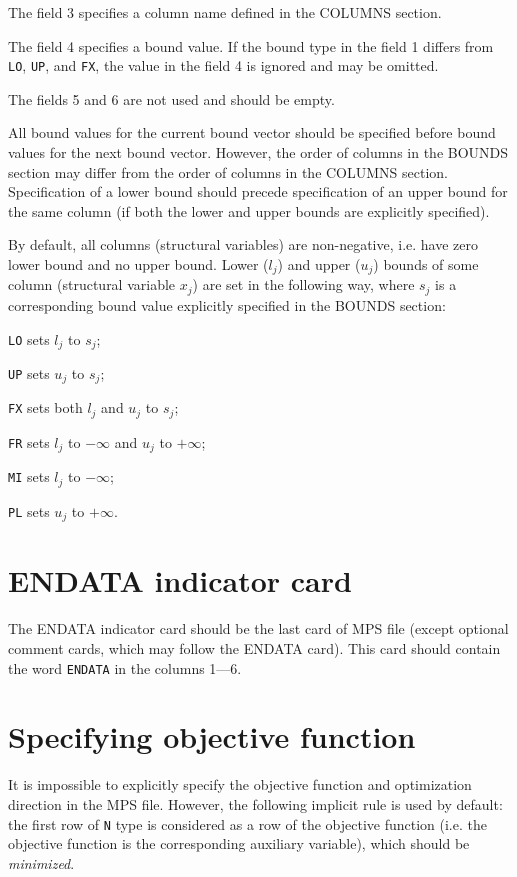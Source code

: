The field 3 specifies a column name defined in the COLUMNS section.

The field 4 specifies a bound value. If the bound type in the field 1
differs from \verb|LO|, \verb|UP|, and \verb|FX|, the value in the field
4 is ignored and may be omitted.

The fields 5 and 6 are not used and should be empty.

All bound values for the current bound vector should be specified before
bound values for the next bound vector. However, the order of columns in
the BOUNDS section may differ from the order of columns in the COLUMNS
section. Specification of a lower bound should precede specification of
an upper bound for the same column (if both the lower and upper bounds
are explicitly specified).

By default, all columns (structural variables) are non-negative, i.e.
have zero lower bound and no upper bound. Lower ($l_j$) and upper
($u_j$) bounds of some column (structural variable $x_j$) are set in the
following way, where $s_j$ is a corresponding bound value explicitly
specified in the BOUNDS section:


\verb|LO| sets $l_j$ to $s_j$;

\verb|UP| sets $u_j$ to $s_j$;

\verb|FX| sets both $l_j$ and $u_j$ to $s_j$;

\verb|FR| sets $l_j$ to $-\infty$ and $u_j$ to $+\infty$;

\verb|MI| sets $l_j$ to $-\infty$;

\verb|PL| sets $u_j$ to $+\infty$.

\section{ENDATA indicator card}

The ENDATA indicator card should be the last card of MPS file (except
optional comment cards, which may follow the ENDATA card). This card
should contain the word \verb|ENDATA| in the columns 1---6.

\section{Specifying objective function}

It is impossible to explicitly specify the objective function and
optimization direction in the MPS file. However, the following implicit
rule is used by default: the first row of \verb|N| type is considered
as a row of the objective function (i.e. the objective function is the
corresponding auxiliary variable), which should be {\it minimized}.

